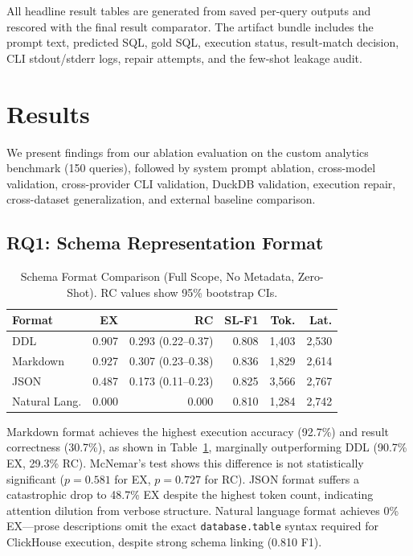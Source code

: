 \documentclass[sigconf, nonacm]{acmart}
\begin{document}
All headline result tables are generated from saved per-query outputs and rescored with the final result comparator. The artifact bundle includes the prompt text, predicted SQL, gold SQL, execution status, result-match decision, CLI stdout/stderr logs, repair attempts, and the few-shot leakage audit.

\section{Results}
\label{sec:results}

We present findings from our ablation evaluation on the custom analytics benchmark (150 queries), followed by system prompt ablation, cross-model validation, cross-provider CLI validation, DuckDB validation, execution repair, cross-dataset generalization, and external baseline comparison.

\subsection{RQ1: Schema Representation Format}

\begin{table}[t]
\caption{Schema Format Comparison (Full Scope, No Metadata, Zero-Shot). RC values show 95\% bootstrap CIs.}
\label{tab:format}
\centering
\footnotesize
\begin{tabular}{lrrrrr}
\toprule
\textbf{Format} & \textbf{EX} & \textbf{RC} & \textbf{SL-F1} & \textbf{Tok.} & \textbf{Lat.} \\
\midrule
DDL & 0.907 & 0.293 (0.22--0.37) & 0.808 & 1,403 & 2,530 \\
Markdown & 0.927 & 0.307 (0.23--0.38) & 0.836 & 1,829 & 2,614 \\
JSON & 0.487 & 0.173 (0.11--0.23) & 0.825 & 3,566 & 2,767 \\
Natural Lang. & 0.000 & 0.000 & 0.810 & 1,284 & 2,742 \\
\bottomrule
\end{tabular}
\end{table}

Markdown format achieves the highest execution accuracy (92.7\%) and result correctness (30.7\%), as shown in Table~\ref{tab:format}, marginally outperforming DDL (90.7\% EX, 29.3\% RC). McNemar's test shows this difference is not statistically significant ($p=0.581$ for EX, $p=0.727$ for RC). JSON format suffers a catastrophic drop to 48.7\% EX despite the highest token count, indicating attention dilution from verbose structure. Natural language format achieves 0\% EX---prose descriptions omit the exact \texttt{database.table} syntax required for ClickHouse execution, despite strong schema linking (0.810 F1).
\end{document}
